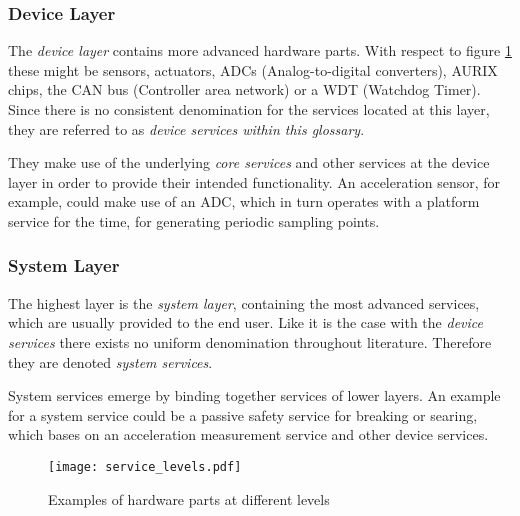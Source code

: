 \subsubsection{Device Layer}
The \emph{device layer} contains more advanced hardware parts. With respect to figure \ref{fig:service_levels} these might be sensors, actuators, ADCs (Analog-to-digital converters), AURIX chips, the CAN bus (Controller area network) or a WDT (Watchdog Timer). Since there is no consistent denomination for the services located at this layer, they are referred to as \emph{device services within this glossary}.

They make use of the underlying \emph{core services} and other services at the device layer in order to provide their intended functionality. 
An acceleration sensor, for example, could make use of an ADC, which in turn operates with a platform service for the time, for generating periodic sampling points.

\subsubsection{System Layer}
The highest layer is the \emph{system layer}, containing the most advanced services, which are usually provided to the end user. Like it is the case with the \emph{device services} there exists no uniform denomination throughout literature. Therefore they are denoted \emph{system services}.

System services emerge by binding together services of lower layers. An example for a system service could be a passive safety service for breaking or searing, which bases on an acceleration measurement service and other device services.


\begin{figure}[ht]
\centering
\texttt{[image: service\_levels.pdf]}
\caption{Examples of hardware parts at different levels \cite{avl}}
\label{fig:service_levels}
\end{figure}

